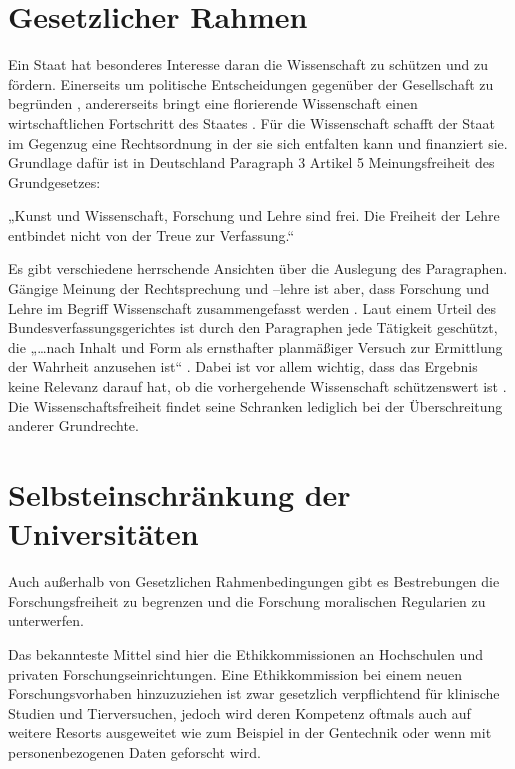 \documentclass{pmwk}
\begin{document}
\section*{Gesetzlicher Rahmen}
Ein Staat hat besonderes Interesse daran die Wissenschaft zu schützen und zu fördern. Einerseits um politische Entscheidungen gegenüber der Gesellschaft zu begründen \cite[11]{Huber}, andererseits bringt eine florierende Wissenschaft einen wirtschaftlichen Fortschritt des Staates \cite[35]{Huber}. Für die Wissenschaft schafft der Staat im Gegenzug eine Rechtsordnung in der sie sich entfalten kann und finanziert sie. Grundlage dafür ist in Deutschland Paragraph 3 Artikel 5 Meinungsfreiheit des Grundgesetzes:\par
„Kunst und Wissenschaft, Forschung und Lehre sind frei. Die Freiheit der Lehre entbindet nicht von der Treue zur Verfassung.“ \cite[Art 5 § 3]{gg}\par
Es gibt verschiedene herrschende Ansichten über die Auslegung des Paragraphen. Gängige Meinung der Rechtsprechung und –lehre ist aber, dass Forschung und Lehre im Begriff Wissenschaft zusammengefasst werden \cite[27]{RechFrei}. Laut einem Urteil des Bundesverfassungsgerichtes ist durch den Paragraphen jede Tätigkeit geschützt, die „…nach Inhalt und Form als ernsthafter planmäßiger Versuch zur Ermittlung der Wahrheit anzusehen ist“ \cite{bvg}. Dabei ist vor allem wichtig, dass das Ergebnis keine Relevanz darauf hat, ob die vorhergehende Wissenschaft schützenswert ist \cite[13]{WisArb}. Die Wissenschaftsfreiheit findet seine Schranken lediglich bei der Überschreitung anderer Grundrechte\cite[61]{Huber}.

\section*{Selbsteinschränkung der Universitäten}
Auch außerhalb von Gesetzlichen Rahmenbedingungen gibt es Bestrebungen die Forschungsfreiheit zu begrenzen und die Forschung moralischen Regularien zu unterwerfen.\par

Das bekannteste Mittel sind hier die Ethikkommissionen an Hochschulen und privaten Forschungseinrichtungen. Eine Ethikkommission bei einem neuen Forschungsvorhaben hinzuzuziehen ist zwar gesetzlich verpflichtend für klinische Studien und Tierversuchen, jedoch wird deren Kompetenz oftmals auch auf weitere Resorts ausgeweitet wie zum Beispiel in der Gentechnik oder wenn mit personenbezogenen Daten geforscht wird.\par
\end{document}
